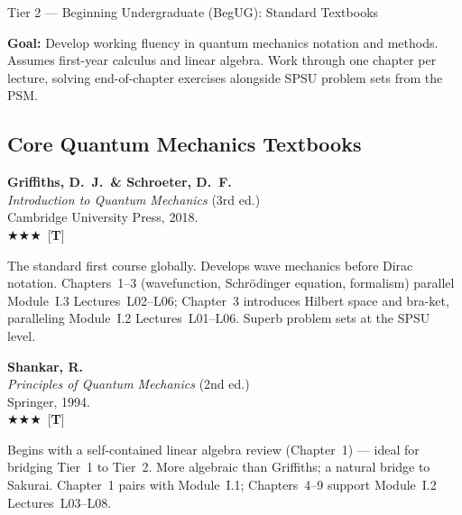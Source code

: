 \documentclass[11pt,a4paper]{article}
\newcommand{\essential}{$\bigstar\bigstar\bigstar$}
\newenvironment{bibentry}[1]{\begin{tcolorbox}[entrybox=#1,top=4pt,bottom=4pt]}{\end{tcolorbox}\smallskip}
\begin{document}
\begin{tcolorbox}[tierheader=t2blue]
Tier 2 --- Beginning Undergraduate (BegUG): Standard Textbooks
\end{tcolorbox}

\medskip
\begin{tcolorbox}[keybox]
\textbf{Goal:} Develop working fluency in quantum mechanics notation and methods.
Assumes first-year calculus and linear algebra. Work through one chapter per
lecture, solving end-of-chapter exercises alongside SPSU problem sets from the PSM.
\end{tcolorbox}

\subsection{Core Quantum Mechanics Textbooks}

\begin{bibentry}{t2light}
\textbf{Griffiths, D.~J.\ \& Schroeter, D.~F.}\\
\textit{Introduction to Quantum Mechanics} (3rd ed.)\\
Cambridge University Press, 2018.\\[3pt]
\essential\ [\textbf{T}]\\[3pt]
\begin{tcolorbox}[annotbox]
The standard first course globally. Develops wave mechanics before Dirac notation.
Chapters~1--3 (wavefunction, Schr\"odinger equation, formalism) parallel Module~I.3
Lectures~L02--L06; Chapter~3 introduces Hilbert space and bra-ket, paralleling
Module~I.2 Lectures~L01--L06. Superb problem sets at the SPSU level.
\end{tcolorbox}
\end{bibentry}

\begin{bibentry}{t2light}
\textbf{Shankar, R.}\\
\textit{Principles of Quantum Mechanics} (2nd ed.)\\
Springer, 1994.\\[3pt]
\essential\ [\textbf{T}]\\[3pt]
\begin{tcolorbox}[annotbox]
Begins with a self-contained linear algebra review (Chapter~1) --- ideal for
bridging Tier~1 to Tier~2. More algebraic than Griffiths; a natural bridge to
Sakurai. Chapter~1 pairs with Module~I.1; Chapters~4--9 support Module~I.2
Lectures~L03--L08.
\end{tcolorbox}
\end{bibentry}
\end{document}

